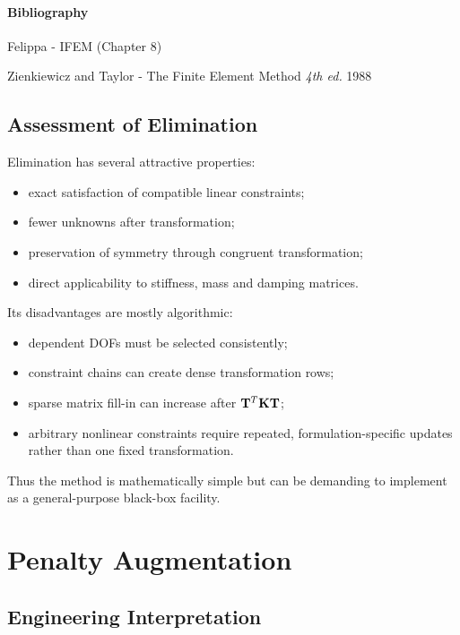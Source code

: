 \paragraph{Bibliography}

Felippa - IFEM (Chapter 8)

Zienkiewicz and Taylor - The Finite Element Method \textit{4th ed.} 1988



\subsection{Assessment of Elimination}

Elimination has several attractive properties:

\begin{itemize}
    \item exact satisfaction of compatible linear constraints;
    \item fewer unknowns after transformation;
    \item preservation of symmetry through congruent transformation;
    \item direct applicability to stiffness, mass and damping matrices.
\end{itemize}

Its disadvantages are mostly algorithmic:

\begin{itemize}
    \item dependent DOFs must be selected consistently;
    \item constraint chains can create dense transformation rows;
    \item sparse matrix fill-in can increase after $\mathbf{T}^T\mathbf{K}\mathbf{T}$;
    \item arbitrary nonlinear constraints require repeated, formulation-specific
    updates rather than one fixed transformation.
\end{itemize}

Thus the method is mathematically simple but can be demanding to implement as a
general-purpose black-box facility.

\section{Penalty Augmentation}\label{sec:mfc-penalty}

\subsection{Engineering Interpretation}

